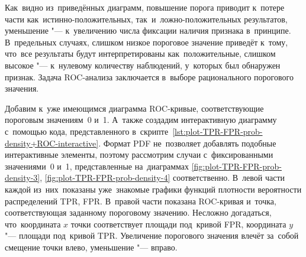 \documentclass[]{scrreprt}
\begin{document}
Как~видно из~приведённых диаграмм, повышение порога приводит к~потере части как~истинно-положительных, так~и~ложно-положительных результатов, уменьшение "--- к~увеличению числа фиксации наличия признака в~принципе. В~предельных случаях, слишком низкое пороговое значение приведёт к~тому, что~все результаты будут интерпретированы как~положительные, слишком высокое "--- к~нулевому количеству наблюдений, у~которых был обнаружен признак. Задача ROC-анализа заключается в~выборе рационального порогового значения.

Добавим к~уже имеющимся диаграмма ROC-кривые, соответствующие пороговым значениям~0 и~1. А~также создадим интерактивную диаграмму с~помощью кода, представленного в~скрипте~\ref{lst:plot-TPR-FPR-prob-density+ROC-interactive}. Формат PDF не~позволяет добавлять подобные интерактивные элементы, поэтому рассмотрим случаи с~фиксированными значениями~0 и~1, представленные на~диаграммах \ref{fig:plot-TPR-FPR-prob-density-3}, \ref{fig:plot-TPR-FPR-prob-density-4} соответственно. В~левой части каждой из~них~показаны уже~знакомые графики функций плотности вероятности распределений TPR, FPR. В~правой части показана ROC-кривая и~точка, соответствующая заданному пороговому значению. Несложно догадаться, что~координата $x$ точки соответствует площади под~кривой FPR, координата $y$ "--- площади под~кривой TPR. Увеличение порогового значения влечёт за~собой смещение точки влево, уменьшение "--- вправо.
\end{document}
